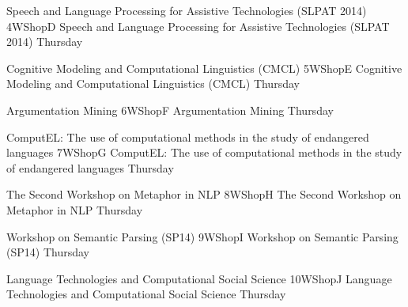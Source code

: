 \begin{wsschedule}
  {Speech and Language Processing for Assistive Technologies (SLPAT 2014)}
  {4}{WShopD}
  {Speech and Language Processing for Assistive Technologies (SLPAT 2014)}
  {Thursday}
  {\WShopLocD}
  
\end{wsschedule}
\begin{wsschedule}
  {Cognitive Modeling and Computational Linguistics (CMCL)}
  {5}{WShopE}
  {Cognitive Modeling and Computational Linguistics (CMCL)}
  {Thursday}
  {\WShopLocE}
  
\end{wsschedule}
\begin{wsschedule}
  {Argumentation Mining}
  {6}{WShopF}
  {Argumentation Mining}
  {Thursday}
  {\WShopLocF}
  
\end{wsschedule}
\begin{wsschedule}
  {ComputEL: The use of computational methods in the study of endangered languages}
  {7}{WShopG}
  {ComputEL: The use of computational methods in the study of endangered languages}
  {Thursday}
  {\WShopLocG}
  
\end{wsschedule}
\begin{wsschedule}
  {The Second Workshop on Metaphor in NLP}
  {8}{WShopH}
  {The Second Workshop on Metaphor in NLP}
  {Thursday}
  {\WShopLocH}
  
\end{wsschedule}
\begin{wsschedule}
  {Workshop on Semantic Parsing (SP14)}
  {9}{WShopI}
  {Workshop on Semantic Parsing (SP14)}
  {Thursday}
  {\WShopLocI}
  
\end{wsschedule}
\begin{wsschedule}
  {Language Technologies and Computational Social Science}
  {10}{WShopJ}
  {Language Technologies and Computational Social Science}
  {Thursday}
  {\WShopLocJ}
  
\end{wsschedule}



